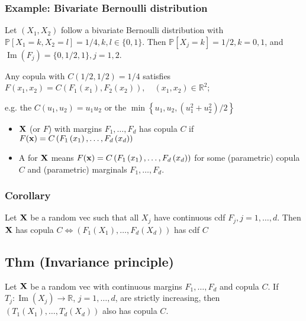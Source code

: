\subsubsection*{Example: Bivariate Bernoulli distribution}
Let $\left(X_{1}, X_{2}\right)$ follow a bivariate Bernoulli distribution with $\mathbb{P}\left[X_{1}=k, X_{2}=l\right]=1 / 4, k, l \in\{0,1\}$. Then $\mathbb{P}\left[X_{j}=k\right]=1 / 2, k=0,1$, and $\operatorname{Im}\left(F_{j}\right)=\{0,1 / 2,1\}, j=1,2$.

Any copula with $C(1 / 2,1 / 2)=1 / 4$ satisfies
$
F\left(x_{1}, x_{2}\right)=C\left(F_{1}\left(x_{1}\right), F_{2}\left(x_{2}\right)\right), \quad\left(x_{1}, x_{2}\right) \in \mathbb{R}^{2}
$;

e.g. the  $C\left(u_{1}, u_{2}\right)=u_{1} u_{2}$ or the  $\min \left\{u_{1}, u_{2},\left(u_{1}^{2}+u_{2}^{2}\right) / 2\right\}$

\begin{itemize}[leftmargin=*]
    \item $\operatorname{\boldsymbol{\mathbf{X}}}$ (or $F$) with margins $F_{1}, \ldots, F_{d}$ has copula $C$ if $F(\operatorname{\boldsymbol{\mathbf{x}}})=C\left(F_{1}\left(x_{1}\right), \ldots, F_{d}\left(x_{d}\right)\right)$
    \item A  for $\operatorname{\boldsymbol{\mathbf{X}}}$ means $F(\operatorname{\boldsymbol{\mathbf{x}}})=C\left(F_{1}\left(x_{1}\right), \ldots, F_{d}\left(x_{d}\right)\right)$ for some (parametric) copula $C$ and (parametric) marginals $F_{1}, \ldots, F_{d}$.
\end{itemize}





\subsubsection*{Corollary}
Let $\operatorname{\boldsymbol{\mathbf{X}}}$ be a random vec such that all $X_{j}$ have continuous cdf $F_{j}, j=1, \ldots, d$.
Then $\operatorname{\boldsymbol{\mathbf{X}}}$ has copula $C \Leftrightarrow\left(F_{1}\left(X_{1}\right), \ldots, F_{d}\left(X_{d}\right)\right)$ has cdf $C$





\subsection*{Thm (Invariance principle)}
Let $\operatorname{\boldsymbol{\mathbf{X}}}$ be a random vec with continuous margins $F_{1}, \ldots, F_{d}$ and copula $C$. If $T_{j}: \operatorname{Im}\left(X_{j}\right) \rightarrow \mathbb{R}$, $j=1, \ldots, d$, are strictly increasing, then $\left(T_{1}\left(X_{1}\right), \ldots, T_{d}\left(X_{d}\right)\right)$ also has copula $C$.

